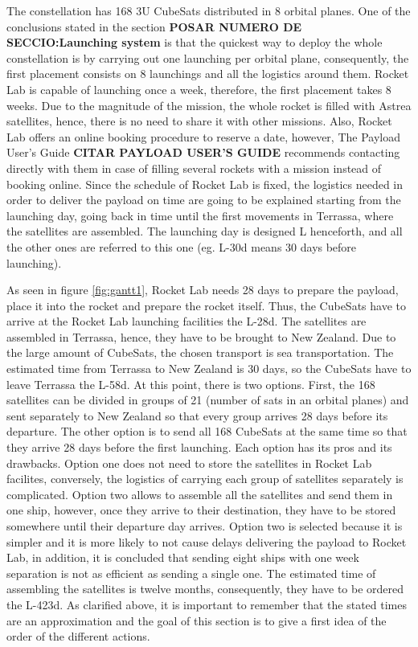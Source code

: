 The constellation has 168 3U CubeSats distributed in 8 orbital planes. One of the conclusions stated in the section  \textbf{POSAR NUMERO DE SECCIO:Launching system}  is that the quickest way to deploy the whole constellation is by carrying out one launching per orbital plane, consequently, the first placement consists on 8 launchings and all the logistics around them. Rocket Lab is capable of launching once a week, therefore, the first placement takes 8 weeks. Due to the magnitude of the mission, the whole rocket is filled with Astrea satellites, hence, there is no need to share it with other missions. Also, Rocket Lab offers an online booking procedure to reserve a date, however, The Payload User's Guide \textbf{CITAR PAYLOAD USER'S GUIDE} recommends contacting directly with them in case of filling several rockets with a mission instead of booking online.  
\newline
Since the schedule of Rocket Lab is fixed, the logistics needed in order to deliver the payload on time are going to be explained starting from the launching day, going back in time until the first movements in Terrassa, where the satellites are assembled. 
The launching day is designed L henceforth, and all the other ones are referred to this one (eg. L-30d means 30 days before launching). 


As seen in figure \ref{fig:gantt1}, Rocket Lab needs 28 days to prepare the payload, place it into the rocket and prepare the rocket itself. Thus, the CubeSats have to arrive at the Rocket Lab launching facilities the L-28d. The satellites are assembled in Terrassa, hence, they have to be brought to New Zealand. Due to the large amount of CubeSats, the chosen transport is sea transportation. The estimated time from Terrassa to New Zealand is 30 days, so the CubeSats have to leave Terrassa the L-58d. At this point, there is two options. First, the 168 satellites can be divided in groups of 21 (number of sats in an orbital planes) and sent separately to New Zealand so that every group arrives 28 days before its departure. The other option is to send all 168 CubeSats at the same time so that they arrive 28 days before the first launching. Each option has its pros and its drawbacks. Option one does not need to store the satellites in Rocket Lab facilites, conversely, the logistics of carrying each group of satellites separately is complicated. Option two allows to assemble all the satellites and send them in one ship, however, once they arrive to their destination, they have to be stored somewhere until their departure day arrives. Option two is selected because it is simpler and it is more likely to not cause delays delivering the payload to Rocket Lab, in addition, it is concluded that sending eight ships with one week separation is not as efficient as sending a single one. 
\newline
The estimated time of assembling the satellites is twelve months, consequently, they have to be ordered the L-423d. 
\newline
As clarified above, it is important to remember that the stated times are an approximation and the goal of this section is to give a first idea of the order of the different actions. 
